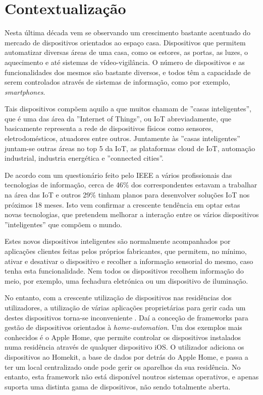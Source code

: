 \chapter{Contextualização}

Nesta última década vem se observando um crescimento bastante acentuado do mercado de dispositivos orientados ao espaço casa. Dispositivos que permitem automatizar diversas áreas de uma casa, como os estores, as portas, as luzes, o aquecimento e até sistemas de vídeo-vigilância. O número de dispositivos e as funcionalidades dos mesmos são bastante diversos, e todos têm a capacidade de serem controlados através de sistemas de informação, como por exemplo, \textit{smartphones}.

Tais dispositivos compõem aquilo a que muitos chamam de ''casas inteligentes'', que é uma das área da ''Internet of Things'', ou IoT abreviadamente, que basicamente representa a rede de dispositivos físicos como sensores, eletrodomésticos, atuadores entre outros. Juntamente às ''casas inteligentes'' juntam-se outras áreas no top 5 da IoT, as plataformas cloud de IoT, automação industrial, industria energética e ''connected cities''.

De acordo com um questionário feito pelo IEEE \cite{ieeesurvey} a vários profissionais das tecnologias de informação, cerca de 46\% dos correspondentes estavam a trabalhar na área das IoT e outros 29\% tinham planos para desenvolver soluções IoT nos próximos 18 meses. Isto vem confirmar a crescente tendência em optar estas novas tecnologias, que pretendem melhorar a interação entre os vários dispositivos ''inteligentes'' que compõem o mundo.

Estes novos dispositivos inteligentes são normalmente acompanhados por aplicações clientes feitas pelos próprios fabricantes, que permitem, no mínimo, ativar e desativar o dispositivo e recolher a informação sensorial do mesmo, caso tenha esta funcionalidade. Nem todos os dispositivos recolhem informação do meio, por exemplo, uma fechadura eletrónica ou um dispositivo de iluminação.

No entanto, com a crescente utilização de dispositivos nas residências dos utilizadores, a utilização de várias aplicações proprietárias para gerir cada um destes dispositivos torna-se inconveniente \cite{iot-survey-issues}. Daí a conceção de frameworks para gestão de dispositivos orientados à \textit{home-automation}. Um dos exemplos mais conhecidos é o Apple Home, que permite controlar os dispositivos instalados numa residência através de qualquer dispositivo iOS. O utilizador adiciona os dispositivos ao Homekit, a base de dados por detrás do Apple Home, e passa a ter um local centralizado onde pode gerir os aparelhos da sua residência. No entanto, esta framework não está disponível noutros sistemas operativos, e apenas suporta uma distinta gama de dispositivos, não sendo totalmente aberta.


